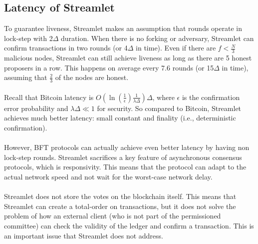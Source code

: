 \documentclass{report}
\begin{document}
\subsection{Latency of Streamlet}
To guarantee liveness, Streamlet makes an assumption that rounds operate in lock-step with 2$\Delta$ duration. When there is no forking or adversary, Streamlet can confirm transactions in two rounds (or 4$\Delta$ in time). Even if there are $f < \frac{N}{3}$ malicious nodes, Streamlet can still achieve liveness as long as there are 5 honest proposers in a row. This happens on average every 7.6 rounds (or 15$\Delta$ in time), assuming that $\frac{2}{3}$ of the nodes are honest.\\\\
Recall that Bitcoin latency is $O(\ln(\frac{1}{\epsilon	})\frac{1}{\lambda\Delta})\Delta$, where $\epsilon$ is the confirmation error probability and $\lambda\Delta \ll 1$ for security. So compared to Bitcoin, Streamlet achieves much better latency: small constant and finality (i.e., deterministic confirmation).\\\\
However, BFT protocols can actually achieve even better latency by having non lock-step rounds. Streamlet sacrifices a key feature of asynchronous consensus protocols, which is responsivity. This means that the protocol can adapt to the actual network speed and not wait for the worst-case network delay. \\\\
Streamlet does not store the votes on the blockchain itself. This means that Streamlet can create a total-order on transactions, but it does not solve the problem of how an external client (who is not part of the permissioned committee) can check the validity of the ledger and confirm a transaction. This is an important issue that Streamlet does not address.
\end{document}
